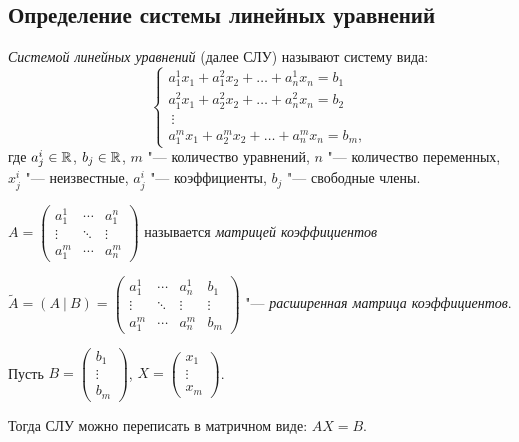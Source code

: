 \subsection*{Определение системы линейных уравнений}
\begin{definition}
    \textit{Системой линейных уравнений} (далее СЛУ) называют систему вида:
    \begin{equation}
        \label{eq:SLU}
        \begin{cases}
        a_1^1x_1 +  a_1^2x_2 + \ldots + a_n^1x_n = b_1 \\
        a_1^2x_1 +  a_2^2x_2 + \ldots + a_n^2x_n = b_2 \\
        ~\vdots \\
        a_1^mx_1 +  a_2^mx_2 + \dots + a_n^mx_n = b_m,
    \end{cases}
    \end{equation} 
    где $a_j^i \in \mathbb{R}$, $b_j \in \mathbb{R}$, $m$ "--- количество уравнений, $n$ "--- количество переменных, $x_j^i$ "--- неизвестные, $a_j^i$ "--- коэффициенты, $b_j$ "--- свободные члены.
\end{definition}
$A = \begin{pmatrix}
    a_1^1 & \cdots & a_1^n \\
    \vdots & \ddots & \vdots \\
    a_1^m & \cdots & a_n^m
\end{pmatrix}$ называется \textit{матрицей коэффициентов}

$\tilde{A} = (A~|~B) =
\left({ 
\begin{array}{ccc|c}
    a_1^1 & \cdots & a_n^1 & b_1 \\
    \vdots & \ddots & \vdots & \vdots \\
    a_1^m & \cdots & a_n^m & b_m
\end{array}} \right)$ "--- \textit{расширенная матрица коэффициентов}.

Пусть $B = \begin{pmatrix}
    b_1 \\
    \vdots \\
    b_m
\end{pmatrix}$, $X = \begin{pmatrix}
    x_1 \\
    \vdots \\
    x_m
\end{pmatrix}$. 

Тогда СЛУ можно переписать в матричном виде:
$ AX = B$.

\vspace{0.2cm}

